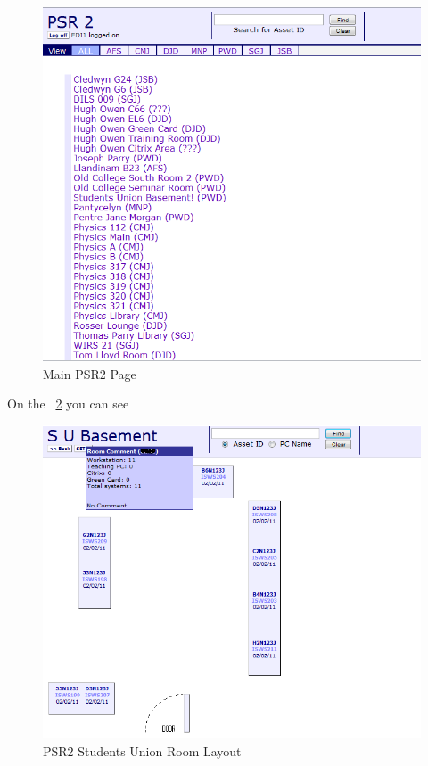 \documentclass[10pt,a4paper,headinclude=true]{report}
\begin{document}
\begin{figure}[H]
\centering
\centerline{\includegraphics[scale=0.3]{./PSR2}}
\caption{Main PSR2 Page}
\label{fig:main_PSR2_page}
\end{figure}

On the ~\ref{fig:PSR2_SU_Room_layout} you can see

\begin{figure}[H]
\begin{center}
\includegraphics[scale=0.5]{./PSR2_SU_Room_layout}
\caption{PSR2 Students Union Room Layout}
\label{fig:PSR2_SU_Room_layout}
\end{center}
\end{figure}
\end{document}
